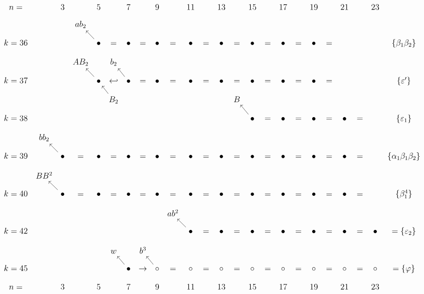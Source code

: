 \documentclass{article}
\begin{document}
\(
\begin{tikzcd}[
nodes={font=\large},
row sep=0.3cm,
column sep=0.1cm,
column 16/.append style={nodes={align=left,anchor=west}}
]
n= & & 3 & & 5 & & 7 & & 9 & & 11 & & 13 & & 15 & & 17 & & 19 & & 21 & & 23 & \\
& & & ab_2 & & \\ 
k=36 & & & & \bullet \arrow[lu] & = & \bullet & = & \bullet & = & \bullet & = & \bullet & = & \bullet & = & \bullet & = & \bullet & = & & & & \{\beta_1\beta_2\} \\
& & & AB_2 & & b_2 \\
k=37 & & & & \bullet \arrow[lu] & \hookleftarrow & \bullet \arrow[lu] & = & \bullet & = & \bullet & = & \bullet & = & \bullet & = & \bullet & = & \bullet & = & & & & \{\varepsilon'\}  \\
& & & & & B_2 \arrow[lu] & & & & & & & & B \\
k=38 & & & & & & & & & & & & & & \bullet \arrow[lu] & = & \bullet & = & \bullet & = & \bullet & = & & \{\varepsilon_1\} \\
& bb_2  & & & & & & & & & & \\ 
k=39 & & \bullet \arrow[lu] & = & \bullet & = & \bullet & = & \bullet & = & \bullet & = & \bullet & = & \bullet & = & \bullet & = & \bullet & = & \bullet & = & & \{\alpha_1\beta_1\beta_2\} \\
& BB^2 & & & &  \\
k=40 & & \bullet \arrow[lu] & = & \bullet & = & \bullet & = & \bullet & = & \bullet & = & \bullet & = & \bullet & = & \bullet & = & \bullet & = & \bullet & = & & \{\beta_1^4\} \\
& & & & & & & & & ab^2 \\
k=42 & & & & & & & & & & \bullet \arrow[lu] & = & \bullet & = & \bullet & = & \bullet & = & \bullet & = & \bullet & = & \bullet & =\{\varepsilon_2\} \\
& & & & & w & & b^3 \\ 
k=45 & & & & & & \bullet \arrow[lu] & \rightarrow & \circ \arrow[lu] & = & \circ & = & \circ & = & \circ & = & \circ & = & \circ & = & \circ & = & \circ & = \{\varphi\} \\
n= & & 3 & & 5 & & 7 & & 9 & & 11 & & 13 & & 15 & & 17 & & 19 & & 21 & & 23 & \\
\end{tikzcd}
\)
\end{document}
